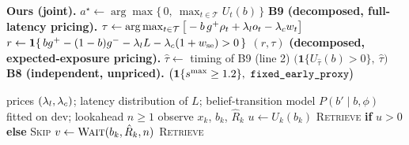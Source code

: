 \begin{algorithm}[t]
\caption{Decision rules at prices $(\lamL,\lamC)$ for one turn with belief $b$. The v1 runs used $\gp=1$, $\gm=\rho_t=0$, $e_t=L-o_t$.}
\label{alg:v1}
\begin{algorithmic}[1]
\Statex \textbf{Ours (joint).}
\State $a^\star\gets\arg\max\{\,0,\ \max_{t\in\mathcal T}U_t(b)\,\}$ 
\Statex \textbf{B9 (decomposed, full-latency pricing).}
\State $\tau\gets\arg\max_{t\in\mathcal T}\big[-b\,g^{+}\rho_t+\lambda_l o_t-\lambda_c w_t\big]$ 
\State $r\gets\mathbf 1\{\,bg^{+}-(1-b)g^{-}-\lambda_l L-\lambda_c(1+w_{\mathrm{se}})>0\,\}$ 
\State \Return $(r,\tau)$
\Statex \textbf{\Bplus{} (decomposed, expected-exposure pricing).}
\State $\hat\tau\gets$ timing of B9 (line 2)
\State \Return $\big(\mathbf 1\{U_{\hat\tau}(b)>0\},\ \hat\tau\big)$
\Statex \textbf{B8 (independent, unpriced).}
\State \Return $\big(\mathbf 1\{s^{\max}\ge 1.2\},\ \pol{fixed\_early\_proxy}\big)$ 
\end{algorithmic}
\end{algorithm}

\begin{algorithm}[t]
\caption{\OursV: joint retrieve/dispatch decision over one turn (commit architecture)}
\label{alg:oursv2}
\begin{algorithmic}[1]
\Require prices $(\lamL,\lamC)$; latency distribution of $L$; belief-transition model $P(b'\mid b,\phi)$ fitted on dev; lookahead $n\ge1$
  \State observe $x_k$, $b_k$, $\hat R_k$ 
  \State $u\gets U_k(b_k)$ 
    \State \Return \textsc{Retrieve} \textbf{if} $u>0$ \textbf{else} \textsc{Skip}
  \EndIf
  \State $v\gets\textsc{Wait}(b_k,\hat R_k,n)$ 
    \State \Return \textsc{Retrieve} 
  \EndIf
\EndFor
\end{algorithmic}
\end{algorithm}

